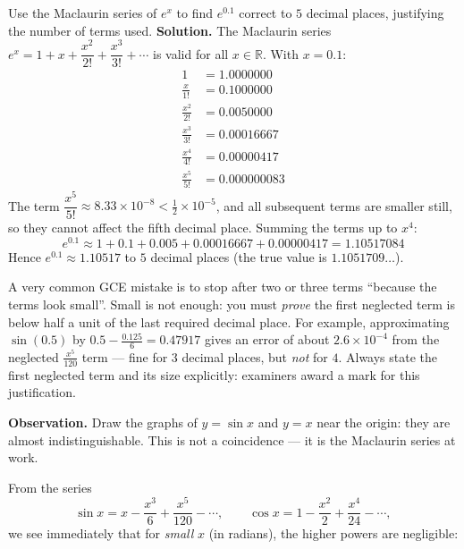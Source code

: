 \documentclass[11pt]{article}
\newcounter{popsec}
\newcounter{popsub}
\newcommand{\courssub}[1]{%
  \stepcounter{popsub}%
  \par\vspace{9pt}\noindent{\popxbold\fontsize{11.5}{13}\selectfont\color{popink}{\color{poporange}\thepopsec.\thepopsub}\hspace{6pt}#1}\par\nopagebreak\vspace{4pt}
}
\begin{document}
\begin{exoresolu}
Use the Maclaurin series of $e^x$ to find $e^{0.1}$ correct to $5$ decimal places, justifying the number of terms used.
\tcblower
\textbf{Solution.} The Maclaurin series $e^x = 1 + x + \dfrac{x^2}{2!} + \dfrac{x^3}{3!} + \cdots$ is valid for all $x \in \mathbb{R}$. With $x = 0.1$:
\begin{align*}
1 &= 1.0000000\\
\frac{x}{1!} &= 0.1000000\\
\frac{x^2}{2!} &= 0.0050000\\
\frac{x^3}{3!} &= 0.00016667\\
\frac{x^4}{4!} &= 0.00000417\\
\frac{x^5}{5!} &= 0.000000083
\end{align*}
The term $\dfrac{x^5}{5!} \approx 8.33\times 10^{-8} < \tfrac12 \times 10^{-5}$, and all subsequent terms are smaller still, so they cannot affect the fifth decimal place. Summing the terms up to $x^4$:
\[ e^{0.1} \approx 1 + 0.1 + 0.005 + 0.00016667 + 0.00000417 = 1.10517084 \]
Hence $\boxed{e^{0.1} \approx 1.10517}$ to $5$ decimal places (the true value is $1.1051709\ldots$).
\end{exoresolu}

\begin{attention}
A very common GCE mistake is to stop after two or three terms ``because the terms look small''. Small is not enough: you must \emph{prove} the first neglected term is below half a unit of the last required decimal place. For example, approximating $\sin(0.5)$ by $0.5 - \frac{0.125}{6} = 0.47917$ gives an error of about $2.6\times 10^{-4}$ from the neglected $\frac{x^5}{120}$ term — fine for $3$ decimal places, but \emph{not} for $4$. Always state the first neglected term and its size explicitly: examiners award a mark for this justification.
\end{attention}

\courssub{Small-Angle Approximations}

\textbf{Observation.} Draw the graphs of $y = \sin x$ and $y = x$ near the origin: they are almost indistinguishable. This is not a coincidence — it is the Maclaurin series at work.

From the series
\[ \sin x = x - \frac{x^3}{6} + \frac{x^5}{120} - \cdots, \qquad \cos x = 1 - \frac{x^2}{2} + \frac{x^4}{24} - \cdots, \]
we see immediately that for \emph{small} $x$ (in radians), the higher powers are negligible:
\end{document}
